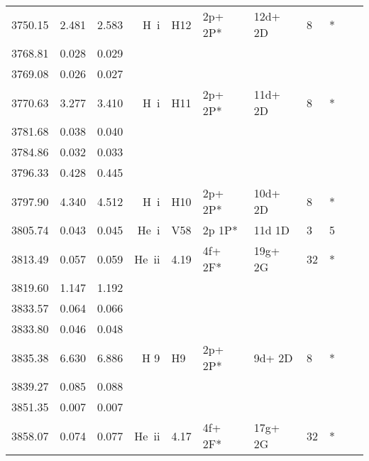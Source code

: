 \begin{longtable}{lrlrlllllll}
 3750.15 &   2.481 &   2.583 &  H~{\sc i}       &  H12       &  2p+ 2P*   &  12d+ 2D   &          8 &        *    \\
 3768.81 &   0.028 &   0.029                                                                                      \\
 3769.08 &   0.026 &   0.027                                                                                      \\
 3770.63 &   3.277 &   3.410 &  H~{\sc i}       &  H11       &  2p+ 2P*   &  11d+ 2D   &          8 &        *    \\
 3781.68 &   0.038 &   0.040                                                                                      \\
 3784.86 &   0.032 &   0.033                                                                                      \\
 3796.33 &   0.428 &   0.445                                                                                      \\
 3797.90 &   4.340 &   4.512 &  H~{\sc i}       &  H10       &  2p+ 2P*   &  10d+ 2D   &          8 &        *    \\
 3805.74 &   0.043 &   0.045 &  He~{\sc i}      &  V58       &  2p 1P*    &  11d 1D    &          3 &        5    \\
 3813.49 &   0.057 &   0.059 &  He~{\sc ii}     &  4.19      &  4f+ 2F*   &  19g+ 2G   &         32 &        *    \\
 3819.60 &   1.147 &   1.192                                                                                      \\
 3833.57 &   0.064 &   0.066                                                                                      \\
 3833.80 &   0.046 &   0.048                                                                                      \\
 3835.38 &   6.630 &   6.886 &  H 9       &  H9        &  2p+ 2P*   &  9d+ 2D    &          8 &        *          \\
 3839.27 &   0.085 &   0.088                                                                                      \\
 3851.35 &   0.007 &   0.007                                                                                      \\
 3858.07 &   0.074 &   0.077 &  He~{\sc ii}     &  4.17      &  4f+ 2F*   &  17g+ 2G   &         32 &        *    \\

\end{longtable}
